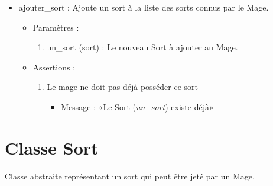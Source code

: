 \documentclass[12pt,pdftex,oneside]{article}
\begin{document}
\begin{itemize}
    \item ajouter\_sort : Ajoute un sort à la liste des sorts connus par le Mage.
      \begin{itemize}
      \item Paramètres : 
        \begin{enumerate}
        \item un\_sort (sort) : Le nouveau Sort à ajouter au Mage.
        \end{enumerate}
      \item Assertions : 
        \begin{enumerate}
        \item Le mage ne doit pas déjà posséder ce sort
          \begin{itemize}
          \item Message : «Le Sort (\emph{un\_sort}) existe déjà»
          \end{itemize}
        \end{enumerate}
      \end{itemize}

  \end{itemize}

  \section {Classe Sort}

  Classe abstraite représentant un sort qui peut être jeté par un Mage.
\end{document}
